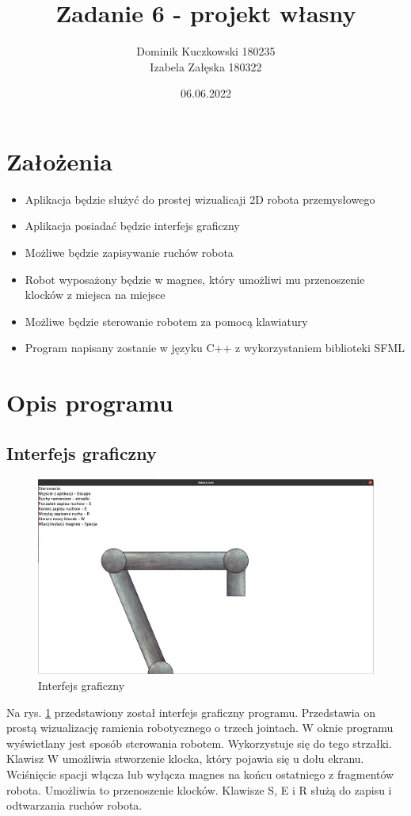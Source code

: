 \documentclass{article}
\title{Zadanie 6 - projekt własny}
\author{Dominik Kuczkowski 180235\\
Izabela Załęska 180322}
\date{06.06.2022}
\begin{document}
\maketitle
\newpage
\section{Założenia}
\begin{itemize}
    \item Aplikacja będzie służyć do prostej wizualicaji 2D robota przemysłowego
    \item Aplikacja posiadać będzie interfejs graficzny
    \item Możliwe będzie zapisywanie ruchów robota
    \item Robot wyposażony będzie w magnes, który umożliwi mu przenoszenie klocków z miejsca na miejsce
    \item Możliwe będzie sterowanie robotem za pomocą klawiatury
    \item Program napisany zostanie w języku C++ z wykorzystaniem biblioteki SFML
\end{itemize}
\section{Opis programu}
\subsection{Interfejs graficzny}
\begin{figure}[h!]
    \includegraphics[width=\linewidth]{RoboticArm.png}
    \caption{Interfejs graficzny}
    \label{intgraf}
\end{figure}
Na rys. \ref{intgraf} przedstawiony został interfejs graficzny
programu. Przedstawia on prostą wizualizację ramienia robotycznego o 
trzech jointach. W oknie programu wyświetlany jest sposób sterowania robotem.
Wykorzystuje się do tego strzałki. Klawisz W umożliwia stworzenie klocka, 
który pojawia się u dołu ekranu. Wciśnięcie spacji włącza lub wyłącza magnes
na końcu ostatniego z fragmentów robota. Umożliwia to przenoszenie klocków.
Klawisze S, E i R służą do zapisu i odtwarzania ruchów robota.
\end{document}
